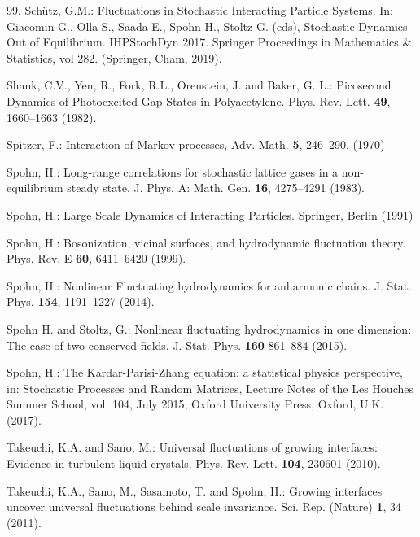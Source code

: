 \documentclass[12pt]{article}
\begin{document}
\begin{thebibliography}{99.}
Sch\"utz, G.M.: 
Fluctuations in Stochastic Interacting Particle Systems.
In: Giacomin G., Olla S., Saada E., Spohn H., Stoltz G. (eds), 
Stochastic Dynamics Out of Equilibrium. IHPStochDyn 2017. 
Springer Proceedings in Mathematics \& Statistics, vol 282. (Springer, Cham, 2019).

Shank, C.V., Yen, R., Fork, R.L., Orenstein, J. and Baker, G. L.:
Picosecond Dynamics of Photoexcited Gap States in Polyacetylene.
Phys. Rev. Lett. \textbf{49}, 1660--1663 (1982).

Spitzer, F.: 
Interaction of Markov processes,
Adv. Math. \textbf{5}, 246--290, (1970)

Spohn, H.:
Long-range correlations for stochastic lattice gases in a non-equilibrium
steady state.
J. Phys. A: Math. Gen. \textbf{16}, 4275--4291 (1983).

Spohn, H.: 
Large Scale Dynamics of Interacting Particles. 
Springer, Berlin (1991)

Spohn, H.: 
Bosonization, vicinal surfaces, and hydrodynamic fluctuation theory.
Phys. Rev. E \textbf{60}, 6411--6420 (1999).

Spohn, H.: 
Nonlinear Fluctuating hydrodynamics for anharmonic chains.
J. Stat. Phys. \textbf{154}, 1191--1227 (2014).

Spohn H. and Stoltz, G.:
Nonlinear fluctuating hydrodynamics in one dimension: The case of 
two conserved fields.
J. Stat. Phys. \textbf{160} 861--884 (2015).

Spohn, H.: 
The Kardar-Parisi-Zhang equation: a statistical physics perspective, 
in: Stochastic Processes and Random Matrices, Lecture Notes of the 
Les Houches Summer School, vol. 104, July 2015, 
Oxford University Press, Oxford, U.K. (2017).

Takeuchi, K.A. and Sano, M.:
Universal fluctuations of growing interfaces: Evidence in turbulent liquid crystals.
Phys. Rev. Lett. \textbf{104}, 230601 (2010).

Takeuchi, K.A., Sano, M., Sasamoto, T. and Spohn, H.:
Growing interfaces uncover universal fluctuations behind scale invariance.
Sci. Rep. (Nature) \textbf{1}, 34 (2011).


\end{thebibliography}
\end{document}
